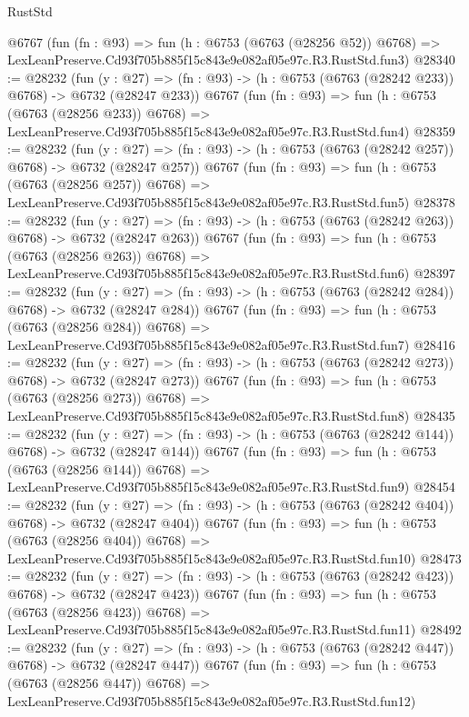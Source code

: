\begin{lexlean}{RustStd}
\begin{coremodule}
    @6767
    (fun (fn : @93) =>
    fun (h : @6753 (@6763 (@28256 @52)) @6768) =>
    LexLeanPreserve.Cd93f705b885f15c843e9e082af05e97c.R3.RustStd.fun3)
@28340 := @28232
    (fun (y : @27) => (fn : @93) -> (h : @6753 (@6763 (@28242 @233)) @6768) -> @6732 (@28247 @233))
    @6767
    (fun (fn : @93) =>
    fun (h : @6753 (@6763 (@28256 @233)) @6768) =>
    LexLeanPreserve.Cd93f705b885f15c843e9e082af05e97c.R3.RustStd.fun4)
@28359 := @28232
    (fun (y : @27) => (fn : @93) -> (h : @6753 (@6763 (@28242 @257)) @6768) -> @6732 (@28247 @257))
    @6767
    (fun (fn : @93) =>
    fun (h : @6753 (@6763 (@28256 @257)) @6768) =>
    LexLeanPreserve.Cd93f705b885f15c843e9e082af05e97c.R3.RustStd.fun5)
@28378 := @28232
    (fun (y : @27) => (fn : @93) -> (h : @6753 (@6763 (@28242 @263)) @6768) -> @6732 (@28247 @263))
    @6767
    (fun (fn : @93) =>
    fun (h : @6753 (@6763 (@28256 @263)) @6768) =>
    LexLeanPreserve.Cd93f705b885f15c843e9e082af05e97c.R3.RustStd.fun6)
@28397 := @28232
    (fun (y : @27) => (fn : @93) -> (h : @6753 (@6763 (@28242 @284)) @6768) -> @6732 (@28247 @284))
    @6767
    (fun (fn : @93) =>
    fun (h : @6753 (@6763 (@28256 @284)) @6768) =>
    LexLeanPreserve.Cd93f705b885f15c843e9e082af05e97c.R3.RustStd.fun7)
@28416 := @28232
    (fun (y : @27) => (fn : @93) -> (h : @6753 (@6763 (@28242 @273)) @6768) -> @6732 (@28247 @273))
    @6767
    (fun (fn : @93) =>
    fun (h : @6753 (@6763 (@28256 @273)) @6768) =>
    LexLeanPreserve.Cd93f705b885f15c843e9e082af05e97c.R3.RustStd.fun8)
@28435 := @28232
    (fun (y : @27) => (fn : @93) -> (h : @6753 (@6763 (@28242 @144)) @6768) -> @6732 (@28247 @144))
    @6767
    (fun (fn : @93) =>
    fun (h : @6753 (@6763 (@28256 @144)) @6768) =>
    LexLeanPreserve.Cd93f705b885f15c843e9e082af05e97c.R3.RustStd.fun9)
@28454 := @28232
    (fun (y : @27) => (fn : @93) -> (h : @6753 (@6763 (@28242 @404)) @6768) -> @6732 (@28247 @404))
    @6767
    (fun (fn : @93) =>
    fun (h : @6753 (@6763 (@28256 @404)) @6768) =>
    LexLeanPreserve.Cd93f705b885f15c843e9e082af05e97c.R3.RustStd.fun10)
@28473 := @28232
    (fun (y : @27) => (fn : @93) -> (h : @6753 (@6763 (@28242 @423)) @6768) -> @6732 (@28247 @423))
    @6767
    (fun (fn : @93) =>
    fun (h : @6753 (@6763 (@28256 @423)) @6768) =>
    LexLeanPreserve.Cd93f705b885f15c843e9e082af05e97c.R3.RustStd.fun11)
@28492 := @28232
    (fun (y : @27) => (fn : @93) -> (h : @6753 (@6763 (@28242 @447)) @6768) -> @6732 (@28247 @447))
    @6767
    (fun (fn : @93) =>
    fun (h : @6753 (@6763 (@28256 @447)) @6768) =>
    LexLeanPreserve.Cd93f705b885f15c843e9e082af05e97c.R3.RustStd.fun12)

\end{coremodule}
\end{lexlean}
